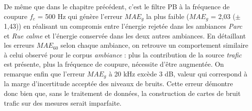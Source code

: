 \begin{table}[h]
\caption{Erreurs moyennes $MAE_{g}$ et $MAE_{60}$ pour l'estimateur \textit{baseline} pour le corpus d'évaluation \textit{SOUR}.}
\label{tab:grafic_baseline}
\centering
{}
\end{table}

De même que dans le chapitre précédent, c'est le filtre PB à la fréquence de coupure $f_c$ = 500 Hz qui génère l'erreur $MAE_g$ la plus faible ($MAE_g$ = 2,03 ($\pm$ 1,43)) en réalisant un compromis entre l'énergie rejetée dans les ambiances \textit{Parc} et \textit{Rue calme} et l'énergie conservée dans les deux autres ambiances. En détaillant les erreurs $MAE_{60}$ selon chaque ambiance, on retrouve un comportement similaire à celui observé pour le corpus \textit{ambiance} : plus la contribution de la source \textit{trafic} est présente, plus la fréquence de coupure, nécessite d'être augmentée. 
On remarque enfin que l'erreur $MAE_g$ à 20 kHz excède 3 dB, valeur qui correspond à la marge d'incertitude acceptée des niveaux de bruits. Cette erreur démontre donc bien que, sans le traitement de données, la construction de cartes de bruit trafic sur des mesures serait imparfaite.


